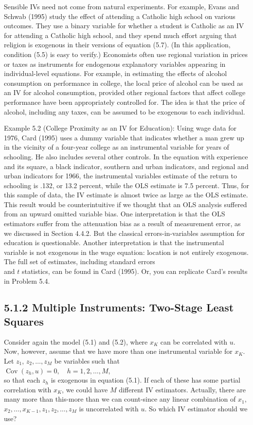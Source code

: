\documentclass[10pt]{article}
\begin{document}
Sensible IVs need not come from natural experiments. For example, Evans and Schwab (1995) study the effect of attending a Catholic high school on various outcomes. They use a binary variable for whether a student is Catholic as an IV for attending a Catholic high school, and they spend much effort arguing that religion is exogenous in their versions of equation (5.7). (In this application, condition (5.5) is easy to verify.) Economists often use regional variation in prices or taxes as instruments for endogenous explanatory variables appearing in individual-level equations. For example, in estimating the effects of alcohol consumption on performance in college, the local price of alcohol can be used as an IV for alcohol consumption, provided other regional factors that affect college performance have been appropriately controlled for. The idea is that the price of alcohol, including any taxes, can be assumed to be exogenous to each individual.

Example 5.2 (College Proximity as an IV for Education): Using wage data for 1976, Card (1995) uses a dummy variable that indicates whether a man grew up in the vicinity of a four-year college as an instrumental variable for years of schooling. He also includes several other controls. In the equation with experience and its square, a black indicator, southern and urban indicators, and regional and urban indicators for 1966, the instrumental variables estimate of the return to schooling is .132, or 13.2 percent, while the OLS estimate is 7.5 percent. Thus, for this sample of data, the IV estimate is almost twice as large as the OLS estimate. This result would be counterintuitive if we thought that an OLS analysis suffered from an upward omitted variable bias. One interpretation is that the OLS estimators suffer from the attenuation bias as a result of measurement error, as we discussed in Section 4.4.2. But the classical errors-in-variables assumption for education is questionable. Another interpretation is that the instrumental variable is not exogenous in the wage equation: location is not entirely exogenous. The full set of estimates, including standard errors\\
and $t$ statistics, can be found in Card (1995). Or, you can replicate Card's results in Problem 5.4.

\subsection*{5.1.2 Multiple Instruments: Two-Stage Least Squares}
Consider again the model (5.1) and (5.2), where $x_{K}$ can be correlated with $u$. Now, however, assume that we have more than one instrumental variable for $x_{K}$. Let $z_{1}$, $z_{2}, \ldots, z_{M}$ be variables such that\\
$\operatorname{Cov}\left(z_{h}, u\right)=0, \quad h=1,2, \ldots, M$,\\
so that each $z_{h}$ is exogenous in equation (5.1). If each of these has some partial correlation with $x_{K}$, we could have $M$ different IV estimators. Actually, there are many more than this-more than we can count-since any linear combination of $x_{1}$, $x_{2}, \ldots, x_{K-1}, z_{1}, z_{2}, \ldots, z_{M}$ is uncorrelated with $u$. So which IV estimator should we use?
\end{document}
